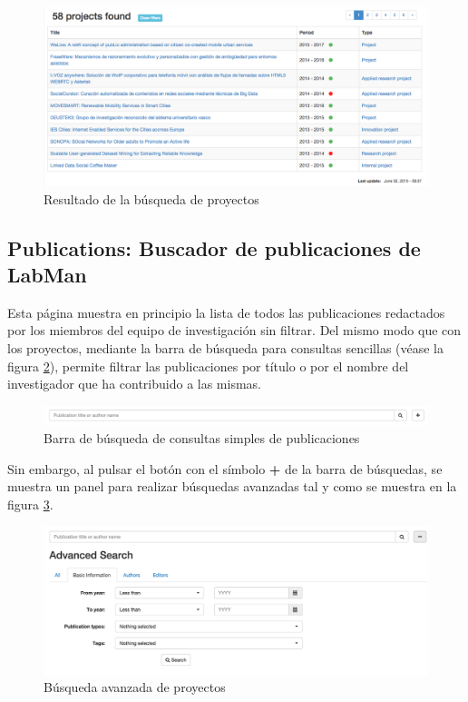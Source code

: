\begin{figure}[!htbp]
	\centering
	\includegraphics[scale=0.31]{fig/projects_search_result}
	\caption{Resultado de la búsqueda de proyectos}
	\label{fig:projects_search_result}
\end{figure}

\subsection{Publications: Buscador de publicaciones de LabMan}

Esta página muestra en principio la lista de todos las publicaciones redactados por los miembros del equipo de investigación sin filtrar. Del mismo modo que con los proyectos, mediante la barra de búsqueda para consultas sencillas (véase la figura \ref{fig:publication_search_bar}), permite filtrar las publicaciones por título o por el nombre del investigador que ha contribuido a las mismas.

\begin{figure}[!htbp]
	\centering
	\includegraphics[scale=0.35]{fig/publication_search_bar}
	\caption{Barra de búsqueda de consultas simples de publicaciones}
	\label{fig:publication_search_bar}
\end{figure}

Sin embargo, al pulsar el botón con el símbolo \textbf{+} de la barra de búsquedas, se muestra un panel para realizar búsquedas avanzadas tal y como se muestra en la figura \ref{fig:publications_advanced_search}.

\begin{figure}[!htbp]
	\centering
	\includegraphics[scale=0.7]{fig/publications_advanced_search}
	\caption{Búsqueda avanzada de proyectos}
	\label{fig:publications_advanced_search}
\end{figure}

